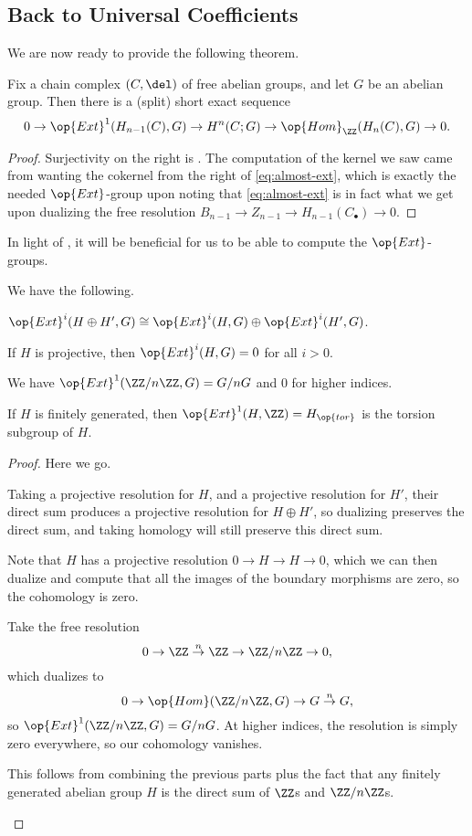 \documentclass[../notes.tex]{subfiles}
\begin{document}
\subsection{Back to Universal Coefficients}
We are now ready to provide the following theorem.
\begin{theorem} \label{thm:univ-coef}
	Fix a chain complex $(C,\del)$ of free abelian groups, and let $G$ be an abelian group. Then there is a (split) short exact sequence
	\[0\to\op{Ext}^1(H_{n-1}(C),G)\to H^n(C;G)\to\op{Hom}_\ZZ(H_n(C),G)\to0.\]
\end{theorem}
\begin{proof}
	Surjectivity on the right is . The computation of the kernel we saw came from wanting the cokernel from the right of \eqref{eq:almost-ext}, which is exactly the needed $\op{Ext}$-group upon noting that \eqref{eq:almost-ext} is in fact what we get upon dualizing the free resolution $B_{n-1}\to Z_{n-1}\to H_{n-1}(C_\bullet)\to0$.
\end{proof}
In light of , it will be beneficial for us to be able to compute the $\op{Ext}$-groups.
\begin{lemma} \label{lem:compute-ext}
	We have the following.
	\begin{listalph}
		\item $\op{Ext}^i(H\oplus H',G)\cong\op{Ext}^i(H,G)\oplus\op{Ext}^i(H',G)$.
		\item If $H$ is projective, then $\op{Ext}^i(H,G)=0$ for all $i>0$.
		\item We have $\op{Ext}^1(\ZZ/n\ZZ,G)=G/nG$ and $0$ for higher indices.
		\item If $H$ is finitely generated, then $\op{Ext}^1(H,\ZZ)=H_{\op{tor}}$ is the torsion subgroup of $H$.
	\end{listalph}
\end{lemma}
\begin{proof}
	Here we go.
	\begin{listalph}
		\item Taking a projective resolution for $H$, and a projective resolution for $H'$, their direct sum produces a projective resolution for $H\oplus H'$, so dualizing preserves the direct sum, and taking homology will still preserve this direct sum.
		\item Note that $H$ has a projective resolution $0\to H\to H\to0$, which we can then dualize and compute that all the images of the boundary morphisms are zero, so the cohomology is zero.
		\item Take the free resolution
		\[0\to\ZZ\stackrel n\to\ZZ\to\ZZ/n\ZZ\to0,\]
		which dualizes to
		\[0\to\op{Hom}(\ZZ/n\ZZ,G)\to G\stackrel n\to G,\]
		so $\op{Ext}^1(\ZZ/n\ZZ,G)=G/nG$. At higher indices, the resolution is simply zero everywhere, so our cohomology vanishes.
		\item This follows from combining the previous parts plus the fact that any finitely generated abelian group $H$ is the direct sum of $\ZZ$s and $\ZZ/n\ZZ$s.
		\qedhere
	\end{listalph}
\end{proof}
\end{document}
